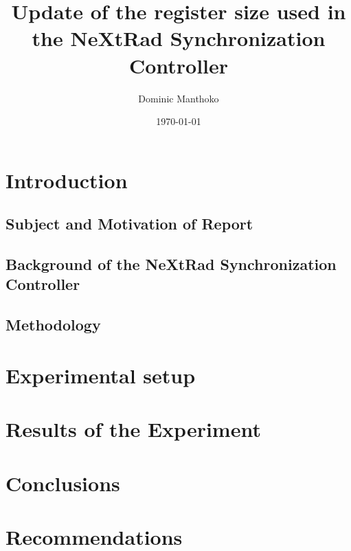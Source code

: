 \documentclass[12pt, a4paper, twoside]{article}
\title{Update of the register size used in the NeXtRad Synchronization Controller}
\author{Dominic Manthoko}
\date{\today}
\begin{document}
\maketitle

\sloppy


\section{Introduction}

\subsection{Subject and Motivation of Report}

\subsection{Background of the NeXtRad Synchronization Controller}

\subsection{Methodology}

\section{Experimental setup}

\section{Results of the Experiment}

\section{Conclusions}

\section{Recommendations}
\end{document}
